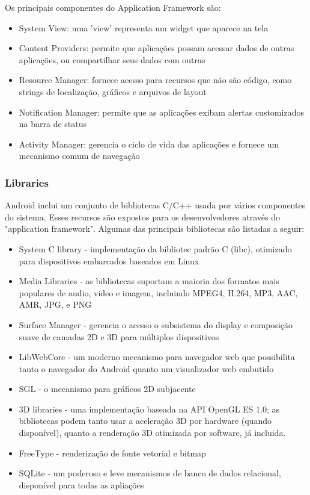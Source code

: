Os principais componentes do Application Framework são:
\begin{itemize}
\sloppy %
    \item System View: uma 'view' representa um widget que aparece na tela
    \item Content Providers: permite que aplicações possam acessar dados de outras 
    aplicações, ou compartilhar seus dados com outras
    \item Resource Manager: fornece acesso para recursos que não são código, como 
    strings de localização, gráficos e arquivos de layout
    \item Notification Manager: permite que as aplicações exibam alertas customizados 
    na barra de status
    \item Activity Manager: gerencia o ciclo de vida das aplicações e fornece um 
    mecanismo comum de navegação
\fussy %
\end{itemize}

\subsubsection{Libraries}
Android inclui um conjunto de bibliotecas C/C++ usada por vários componentes do 
sistema. Esses recursos são expostos para os desenvolvedores através do "application 
framework". Algumas das principais bibliotecas são listadas a seguir:

\begin{itemize}
    \item System C library - implementação da bibliotec padrão C (libc), otimizado
    para dispositivos embarcados baseados em Linux
    \item Media Libraries - as bibliotecas suportam a maioria dos formatos mais 
    populares de audio, video e imagem, incluindo MPEG4, H.264, MP3, AAC, AMR, 
    JPG, e PNG
    \item Surface Manager - gerencia o acesso o subsistema do display e composição 
    suave de camadas 2D e 3D para múltiplos dispositivos
    \item LibWebCore - um moderno mecanismo para navegador web que possibilita tanto o 
    navegador do Android quanto um visualizador web embutido
    \item SGL - o mecanismo para gráficos 2D subjacente
    \item 3D libraries - uma implementação baseada na API OpenGL ES 1.0; as bibliotecas
    podem tanto usar a aceleração 3D por hardware (quando disponível), quanto
    a renderação 3D otimizada por software, já incluida.
    \item FreeType - renderização de fonte vetorial e bitmap
    \item SQLite - um poderoso e leve mecanismos de banco de dados relacional, 
    disponível para todas as apliações
\end{itemize}

